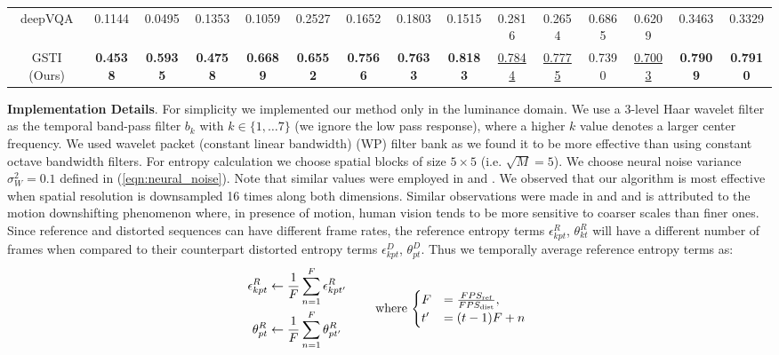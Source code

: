 \documentclass[journal]{IEEEtran}
\newcommand{\ie}{{i}.{e}.}
\begin{document}
\begin{table*}[t]
{\begin{tabular}{|c||c|c|c|c|c|c|c|c|c|c|c|c|c|c|}
			deepVQA \cite{kim2018deep} & 0.1144 & 0.0495 & 0.1353 & 0.1059 & 0.2527 & 0.1652 & 0.1803 & 0.1515 & 0.2816 & 0.2654 & 0.6865 & 0.6209 & 0.3463 & 0.3329\\
        GSTI (Ours) & \textbf{0.4538} & \textbf{0.5935} & \textbf{0.4758} & \textbf{0.6689} & \textbf{0.6552} & \textbf{0.7566} & \textbf{0.7633} & \textbf{0.8183} & \underline{0.7844} & \underline{0.7775} & 0.7390 & \underline{0.7003} & \textbf{0.7909} & \textbf{0.7910}\\
        \hline
    \end{tabular}}
\end{table*}

\textbf{Implementation Details}. For simplicity we implemented our method only in the luminance domain. We use a 3-level Haar wavelet filter as the temporal band-pass filter $b_k$ with $k \in \{1,\ldots 7\}$ (we ignore the low pass response), where a higher $k$ value denotes a larger center frequency. We used wavelet packet (constant linear bandwidth) (WP) filter bank \cite{coifman1992entropy} as we found it to be more effective than using constant octave bandwidth filters. For entropy calculation we choose spatial blocks of size $5 \times 5$ (\ie{ }$\sqrt{M} = 5$). We choose neural noise variance $\sigma_W ^2 = 0.1$ defined in (\ref{eqn:neural_noise}). Note that similar values were employed in \cite{sheikh2006image} and \cite{soundararajan2012rred}. We observed that our algorithm is most effective when spatial resolution is downsampled 16 times along both dimensions. Similar observations were made in \cite{soundararajan2012video} and \cite{bampis2017speed} and is attributed to the motion downshifting phenomenon where, in presence of motion, human vision tends to be more sensitive to coarser scales than finer ones. Since reference and distorted sequences can have different frame rates, the reference entropy terms $\epsilon_{kpt} ^R$, $\theta_{kt} ^R$ will have a different number of frames when compared to their counterpart distorted entropy terms $\epsilon_{kpt} ^D$, $\theta_{pt} ^D$. Thus we temporally average reference entropy terms as:
\vspace{-2pt}
\begin{equation*}
\begin{aligned}
{\epsilon}_{kpt}^R &\leftarrow \frac{1}{F}\sum_{n=1}^F \epsilon_{kpt'}^R
 &\quad &\raisebox{-1.5\normalbaselineskip}[0pt][0pt]{
     where \text{$
     \begin{cases}
        F &= \frac{FPS_{\textrm{ref}}}{FPS_{\textrm{dist}}}, \\
        t' &= (t - 1)F + n
      \end{cases}$
    }} \\
{\theta}_{pt}^R &\leftarrow \frac{1}{F}\sum_{n=1}^F \theta_{pt'}^R
\end{aligned}
\end{equation*}
\end{document}
